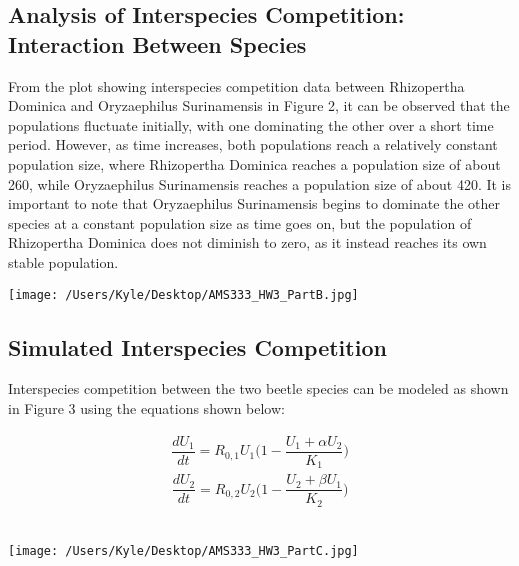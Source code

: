 \documentclass[12pt]{article}
\begin{document}
\subsection*{Analysis of Interspecies Competition: Interaction Between Species}

From the plot showing interspecies competition data between Rhizopertha Dominica and Oryzaephilus Surinamensis in Figure 2, it can be observed that the populations fluctuate initially, with one dominating the other over a short time period. However, as time increases, both populations reach a relatively constant population size, where Rhizopertha Dominica reaches a population size of about 260, while Oryzaephilus Surinamensis reaches a population size of about 420. It is important to note that Oryzaephilus Surinamensis begins to dominate the other species at a constant population size as time goes on, but the population of Rhizopertha Dominica does not diminish to zero, as it instead reaches its own stable population.

\begin{center}
   \texttt{[image: /Users/Kyle/Desktop/AMS333\_HW3\_PartB.jpg]}
\end{center}

\subsection*{Simulated Interspecies Competition}

Interspecies competition between the two beetle species can be modeled as shown in Figure 3 using the equations shown below:

\begin{gather*}
\dfrac{dU_1}{dt} = R_{0,1}U_1\Big(1 - \dfrac{U_1+{\alpha}U_2}{K_1}\Big) 
\end{gather*}
\begin{gather*}
\dfrac{dU_2}{dt} = R_{0,2}U_2\Big(1 - \dfrac{U_2+{\beta}U_1}{K_2}\Big) 
\end{gather*}\

\begin{center}
   \texttt{[image: /Users/Kyle/Desktop/AMS333\_HW3\_PartC.jpg]}
\end{center}
\end{document}

